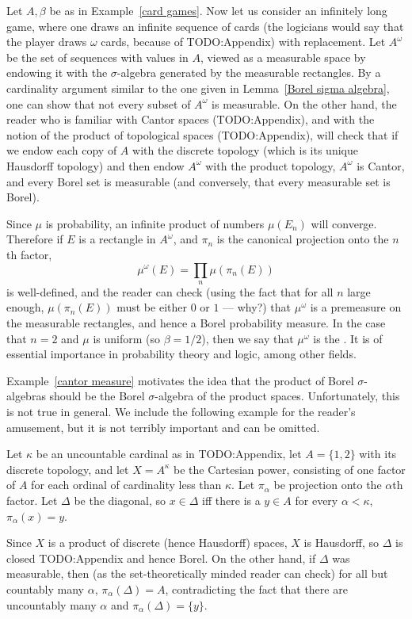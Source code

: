 \begin{example}\label{cantor measure}
Let $A, \beta$ be as in Example~\ref{card games}.
Now let us consider an infinitely long game, where one draws an infinite sequence of cards (the logicians would say that the player draws $\omega$ cards, because of TODO:Appendix) with replacement.
Let $A^{\omega}$ be the set of sequences with values in $A$, viewed as a measurable space by endowing it with the $\sigma$-algebra generated by the measurable rectangles.
By a cardinality argument similar to the one given in Lemma~\ref{Borel sigma algebra}, one can show that not every subset of $A^{\omega}$ is measurable.
On the other hand, the reader who is familiar with Cantor spaces (TODO:Appendix), and with the notion of the product of topological spaces (TODO:Appendix), will check that if we endow each copy of $A$ with the discrete topology (which is its unique Hausdorff topology) and then endow $A^{\omega}$ with the product topology, $A^{\omega}$ is Cantor, and every Borel set is measurable (and conversely, that every measurable set is Borel).

Since $\mu$ is probability, an infinite product of numbers $\mu(E_{n})$ will converge. Therefore if $E$ is a rectangle in $A^{\omega}$, and $\pi_{n}$ is the canonical projection onto the $n$th factor,
\[\mu^{\omega}(E) = \prod_{n} \mu(\pi_{n}(E))\]
is well-defined, and the reader can check (using the fact that for all $n$ large enough, $\mu(\pi_{n}(E))$ must be either $0$ or $1$ --- why?) that $\mu^{\omega}$ is a premeasure on the measurable rectangles, and hence a Borel probability measure.
In the case that $n = 2$ and $\mu$ is uniform (so $\beta = 1/2$), then we say that $\mu^{\omega}$ is the .
It is of essential importance in probability theory and logic, among other fields.
\end{example}

Example~\ref{cantor measure} motivates the idea that the product of Borel $\sigma$-algebras should be the Borel $\sigma$-algebra of the product spaces.
Unfortunately, this is not true in general.
We include the following example for the reader's amusement, but it is not terribly important and can be omitted.

\begin{example}
Let $\kappa$ be an uncountable cardinal as in TODO:Appendix, let $A = \{1, 2\}$ with its discrete topology, and let $X = A^{\kappa}$ be the Cartesian power, consisting of one factor of $A$ for each ordinal of cardinality less than $\kappa$. Let $\pi_{\alpha}$ be projection onto the $\alpha$th factor.
Let $\Delta$ be the diagonal, so $x \in \Delta$ iff there is a $y \in A$ for every $\alpha < \kappa$, $\pi_{\alpha}(x) = y$.

Since $X$ is a product of discrete (hence Hausdorff) spaces, $X$ is Hausdorff, so $\Delta$ is closed TODO:Appendix and hence Borel.
On the other hand, if $\Delta$ was measurable, then (as the set-theoretically minded reader can check) for all but countably many $\alpha$, $\pi_{\alpha}(\Delta) = A$, contradicting the fact that there are uncountably many $\alpha$ and $\pi_{\alpha}(\Delta) = \{y\}$.
\end{example}

